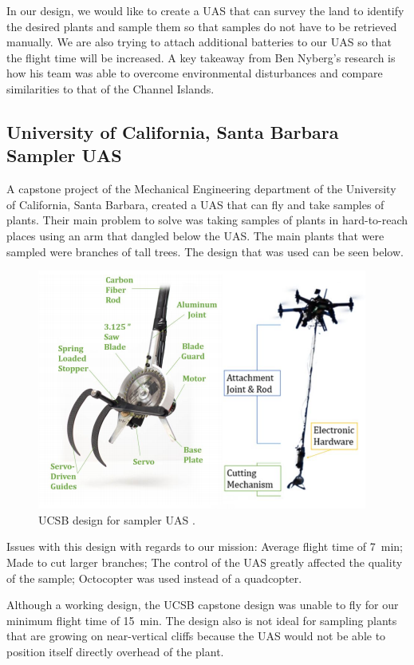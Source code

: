 \documentclass{wrcecapstone}
\begin{document}
In our design, we would like to create a UAS that can survey the land to identify the desired plants and sample them so that samples do not have to be retrieved manually.  We are also trying to attach additional batteries to our UAS so that the flight time will be increased. A key takeaway from Ben Nyberg’s research is how his team was able to overcome environmental disturbances and compare similarities to that of the Channel Islands. 

\subsection{University of California, Santa Barbara Sampler UAS}
A capstone project of the Mechanical Engineering department of the University of California, Santa Barbara, created a UAS that can fly and take samples of plants.  Their main problem to solve was taking samples of plants in hard-to-reach places using an arm that dangled below the UAS.  The main plants that were sampled were branches of tall trees.  The design that was used can be seen below.
\begin{figure}
\begin{center}
\includegraphics[width=0.8\columnwidth]{figures/fig32-ucsb.png}
\end{center}
\caption{UCSB design for sampler UAS \cite{dantonio2018sampler}.}
\label{fig:3.2}
\end{figure}

Issues with this design with regards to our mission: Average flight time of \SI{7}{\minute}; Made to cut larger branches; The control of the UAS greatly affected the quality of the sample; Octocopter was used instead of a quadcopter.

Although a working design, the UCSB capstone design was unable to fly for our minimum flight time of \SI{15}{\minute}.  The design also is not ideal for sampling plants that are growing on near-vertical cliffs because the UAS would not be able to position itself directly overhead of the plant. 
\end{document}
